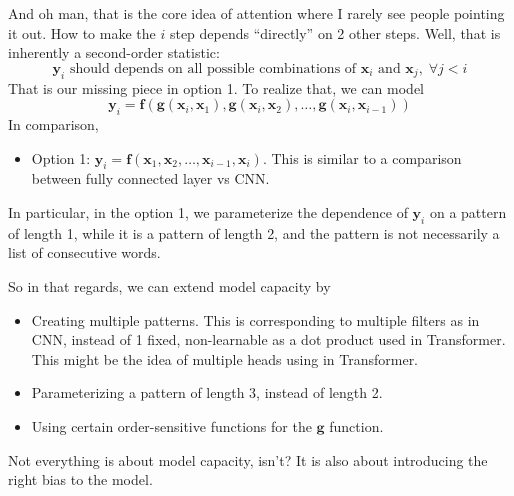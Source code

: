 \documentclass[11pt,a4paper]{article}
\begin{document}
And oh man, that is the core idea of attention where I rarely see people pointing it out. How to make the $i$ step depends ``directly'' on 2 other steps. Well, that is inherently a second-order statistic:
\[
\bm{y}_i \text{ should depends on all possible combinations of } \bm{x}_i \text{ and }\bm{x}_j, \; \forall j < i
\] 
That is our missing piece in option 1.
To realize that, we can model
\[
\bm{y}_i = \bm{f}(\bm{g}(\bm{x}_i, \bm{x}_1), \bm{g}(\bm{x}_i, \bm{x}_2), \ldots , \bm{g}(\bm{x}_i, \bm{x}_{i-1}))
\] 
In comparison,
\begin{itemize}
    \item Option 1: $\bm{y}_i = \bm{f}(\bm{x}_1, \bm{x}_2, \ldots , \bm{x}_{i-1}, \bm{x}_i)$.
        This is similar to a comparison between fully connected layer vs CNN.
\end{itemize}
In particular, in the option 1, we parameterize the dependence of $\bm{y}_i$ on a pattern of length 1, while it is a pattern of length 2, and the pattern is not necessarily a list of consecutive words.

So in that regards, we can extend model capacity by 
\begin{itemize}
    \item Creating multiple patterns. This is corresponding to multiple filters as in CNN, instead of 1 fixed, non-learnable as a dot product used in Transformer. This might be the idea of multiple heads using in Transformer.
    \item Parameterizing a pattern of length 3, instead of length 2.
    \item Using certain order-sensitive functions for the $\bm{g}$ function.
\end{itemize}

Not everything is about model capacity, isn't? It is also about introducing the right bias to the model.

\printbibliography
\end{document}
